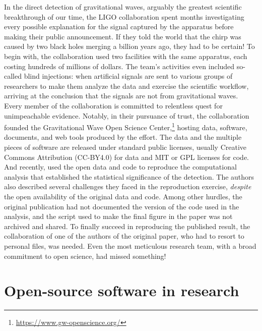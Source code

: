 \documentclass{statement}
\newlength{\up}
\begin{document}
In the direct detection of gravitational waves, arguably the greatest scientific breakthrough of our time, the LIGO collaboration spent months investigating every possible explanation for the signal captured by the apparatus before making their public announcement. 
If they told the world that the chirp was caused by two black holes merging a billion years ago, they had to be certain! 
To begin with, the collaboration used two facilities with the same apparatus, each costing hundreds of millions of dollars. 
The team's activities even included so-called blind injections: when artificial signals are sent to various groups of researchers to make them analyze the data and exercise the scientific workflow, arriving at the conclusion that the signals are not from gravitational waves. 
Every member of the collaboration is committed to relentless quest for unimpeachable evidence. 
Notably, in their pursuance of trust, the collaboration founded the Gravitational Wave Open Science Center,\footnote{\url{https://www.gw-openscience.org/}} hosting data, software, documents, and web tools produced by the effort. 
The data and the multiple pieces of software are released under standard public licenses, usually Creative Commons Attribution (CC-BY4.0) for data and MIT or GPL licenses for code. 
And recently, \cite{brown2021} used the open data and code to reproduce the computational analysis that established the statistical significance of the detection. 
The authors also described several challenges they faced in the reproduction exercise, \emph{despite} the open availability of the original data and code. 
Among other hurdles, the original publication had not documented the version of the code used in the analysis, and the script used to make the final figure in the paper was not archived and shared. 
To finally succeed in reproducing the published result, the collaboration of one of the authors of the original paper, who had to resort to personal files, was needed. 
Even the most meticulous research team, with a broad commitment to open science, had missed something!

\section*{Open-source software in research}
\vspace{\up}
\end{document}
